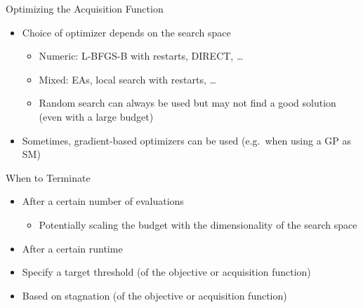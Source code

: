 \documentclass[main]{subfiles}
\begin{document}

\begin{frame}{Optimizing the Acquisition Function}
    \begin{itemize}
        \item Choice of optimizer depends on the search space
            \begin{itemize}
                \item Numeric: L-BFGS-B with restarts, DIRECT, \ldots
                \item Mixed: EAs, local search with restarts, \ldots
                \item Random search can always be used but may not find a good solution (even with a large budget)
            \end{itemize}
        \item Sometimes, gradient-based optimizers can be used (e.g.\ when using a GP as SM)
    \end{itemize}
\end{frame}


\begin{frame}{When to Terminate}
    \begin{itemize}
        \item After a certain number of evaluations
            \begin{itemize}
                \item Potentially scaling the budget with the dimensionality of the search space
            \end{itemize}
        \item After a certain runtime
        \item Specify a target threshold (of the objective or acquisition function)
        \item Based on stagnation (of the objective or acquisition function)
    \end{itemize}
\end{frame}

\end{document}
